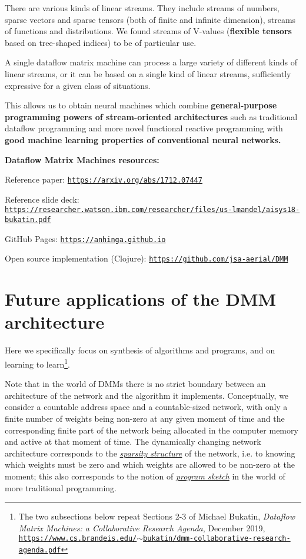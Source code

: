 \documentclass{article}
\begin{document}
There are various kinds of linear streams. They include streams of numbers, sparse vectors and sparse tensors (both of
finite and infinite dimension), streams of functions and distributions. We found streams of V-values
({\bf flexible tensors} based on tree-shaped indices) to be of particular use.

A single dataflow matrix machine can process a large variety of different kinds of linear streams, or
it can be based on a single kind of linear streams, sufficiently expressive for a given class of situations.

This allows us to obtain 
neural machines which combine {\bf general-purpose programming powers of stream-oriented
architectures} such as traditional dataflow programming and
more novel functional reactive programming with {\bf good machine learning
properties of conventional neural networks.}

\vspace{0.1in}
\noindent
{\bf Dataflow Matrix Machines resources:}

Reference paper: \href{https://arxiv.org/abs/1712.07447}{\tt https://arxiv.org/abs/1712.07447}

Reference slide deck: \href{https://researcher.watson.ibm.com/researcher/files/us-lmandel/aisys18-bukatin.pdf}{\footnotesize\tt https://researcher.watson.ibm.com/researcher/files/us-lmandel/aisys18-bukatin.pdf}

GitHub Pages: \href{https://anhinga.github.io/}{\tt https://anhinga.github.io}

Open source implementation (Clojure): \href{https://github.com/jsa-aerial/DMM}{\tt https://github.com/jsa-aerial/DMM}

\section{Future applications of the DMM architecture}

Here we specifically focus on synthesis of algorithms and programs, and on learning to learn\footnote{The two subsections below repeat Sections 2-3
of Michael Bukatin, {\em Dataflow Matrix Machines:  a Collaborative Research Agenda},
December 2019, \href{https://www.cs.brandeis.edu/~bukatin/dmm-collaborative-research-agenda.pdf}
{\tt https://www.cs.brandeis.edu/$\sim$bukatin/dmm-collaborative-research-agenda.pdf}}.

Note that in the world of DMMs there is no strict boundary between an architecture of the network and the algorithm
it implements. Conceptually, we consider a countable address space and a countable-sized network, with only a
finite number of weights being non-zero at any given moment of time and the corresponding finite part of the network being
allocated in the computer memory and active at that moment of time. 
The dynamically changing network architecture corresponds to the \underline{\em sparsity structure} of the network, i.e. to
knowing which weights must be zero and which weights are allowed to be non-zero at the moment; 
this also corresponds to the notion of
\underline{\em program sketch} in the world of more traditional programming.
\end{document}
